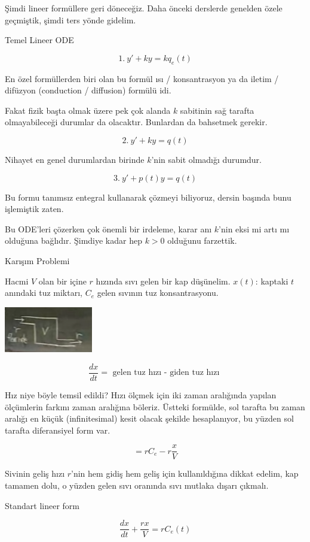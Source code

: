 \documentclass[12pt,fleqn]{article}\usepackage{../../common}
\begin{document}
Şimdi lineer formüllere geri döneceğiz. Daha önceki derslerde genelden
özele geçmiştik, şimdi ters yönde gidelim. 

Temel Lineer ODE

$$1. \  y' + ky = kq_e(t) $$ 

En özel formüllerden biri olan bu formül ısı / konsantrasyon ya da iletim /
difüzyon (conduction / diffusion) formülü idi.

Fakat fizik başta olmak üzere pek çok alanda $k$ sabitinin sağ tarafta
olmayabileceği durumlar da olacaktır. Bunlardan da bahsetmek gerekir.

$$ 2. \ y' + ky = q(t) $$

Nihayet en genel durumlardan birinde $k$'nin sabit olmadığı durumdur.

$$ 3. \ y' + p(t)y = q(t) $$

Bu formu tanımsız entegral kullanarak çözmeyi biliyoruz, dersin başında
bunu işlemiştik zaten.

Bu ODE'leri çözerken çok önemli bir irdeleme, karar anı $k$'nin eksi mi
artı mı olduğuna bağlıdır. Şimdiye kadar hep $k>0$ olduğunu farzettik. 

Karışım Problemi

Hacmi $V$ olan bir içine $r$ hızında sıvı gelen bir kap düşünelim. $x(t)$:
kaptaki $t$ anındaki tuz miktarı, $C_e$ gelen sıvının tuz konsantrasyonu. 

\includegraphics[height=2cm]{8_5.png}

$$ \frac{dx}{dt} = \textrm{ gelen tuz hızı - giden tuz hızı } $$

Hız niye böyle temsil edildi? Hızı ölçmek için iki zaman aralığında yapılan
ölçümlerin farkını zaman aralığına böleriz. Üstteki formülde, sol tarafta
bu zaman aralığı en küçük (infinitesimal) kesit olacak şekilde
hesaplanıyor, bu yüzden sol tarafta diferansiyel form var. 

$$ = r C_e - r \frac{x}{V} $$

Sivinin geliş hızı $r$'nin hem gidiş hem geliş için kullanıldığına dikkat
edelim, kap tamamen dolu, o yüzden gelen sıvı oranında sıvı mutlaka dışarı
çıkmalı. 

Standart lineer form

$$ \frac{dx}{dt} + \frac{rx}{V} = rC_e(t) $$
\end{document}

